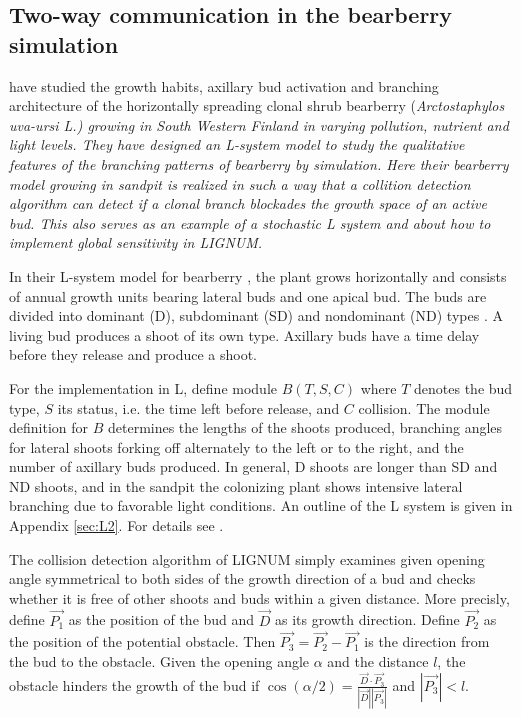 \subsection{Two-way communication in the bearberry simulation}
\label{sec:bearberry}

\citet{salemaa:02}  have  studied  the  growth  habits,  axillary  bud
activation  and branching architecture  of the  horizontally spreading
clonal shrub  bearberry (\it Arctostaphylos uva-ursi  \rm L.)  growing
in  South Western  Finland in  varying pollution,  nutrient  and light
levels.  They have designed an L-system model to study the qualitative
features of  the branching patterns of bearberry  by simulation.  Here
their bearberry  model growing  in sandpit is  realized in such  a way
that a  collition detection  algorithm can detect  if a  clonal branch
blockades the growth  space of an active bud.  This  also serves as an
example  of a  stochastic  L  system \citep{pp:90}  and  about how  to
implement global sensitivity \citep{kurth:94} in LIGNUM.

In their  L-system model  for bearberry \citep{salemaa:02},  the plant
grows horizontally and consists of annual growth units bearing lateral
buds  and one apical  bud.  The  buds are  divided into  dominant (D),
subdominant  (SD) and nondominant  (ND) types  \citep{remphrey:83}.  A
living bud  produces a shoot  of its own  type.  Axillary buds  have a
time delay before they release and produce a shoot.

For  the  implementation in  L,  define  module  $B(T,S,C)$ where  $T$
denotes  the bud  type,  $S$ its  status,  i.e. the  time left  before
release, and $C$ collision.   The module definition for $B$ determines
the  lengths of  the  shoots produced,  branching  angles for  lateral
shoots forking  off alternately to the  left or to the  right, and the
number of  axillary buds  produced.  In general,  D shoots  are longer
than SD and  ND shoots, and in the sandpit  the colonizing plant shows
intensive  lateral branching  due to  favorable light  conditions.  An
outline  of the  L  system  is given  in  Appendix \ref{sec:L2}.   For
details see \citet{salemaa:02}.

The  collision detection  algorithm  of LIGNUM  simply examines  given
opening angle symmetrical  to both sides of the  growth direction of a
bud and  checks whether it is free  of other shoots and  buds within a
given distance.  More precisly, define $\vec {P_1}$ as the position of
the bud and $\vec D$ as  its growth direction.  Define $\vec {P_2}$ as
the position of the potential  obstacle. Then $\vec {P_3} = \vec {P_2}
- \vec {P_1}$  is the direction from  the bud to  the obstacle.  Given
the opening angle $\alpha$ and  the distance $l$, the obstacle hinders
the growth of the bud  if $\cos(\alpha/2) = \frac{{\vec D} \cdot {\vec
{P_3}}} {|\vec D||\vec {P_3}|}$ and $|\vec {P_3}| < l$.

